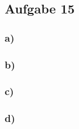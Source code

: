 \subsection*{Aufgabe 15}
\subsubsection*{a)}

\subsubsection*{b)}

\subsubsection*{c)}

\subsubsection*{d)}

